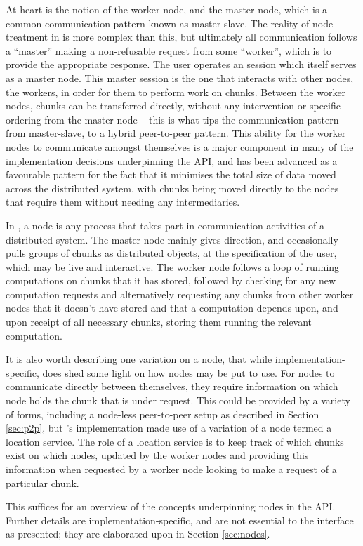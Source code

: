 At heart is the notion of the worker node, and the master node, which is a common communication pattern known as master-slave\cite{rfc2136}.
The reality of node treatment in \lsr is more complex than this, but ultimately all communication follows a ``master'' making a non-refusable request from some ``worker'', which is to provide the appropriate response.
The user operates an \R session which itself serves as a master node.
This master session is the one that interacts with other nodes, the workers, in order for them to perform work on chunks.
Between the worker nodes, chunks can be transferred directly, without any intervention or specific ordering from the master node -- this is what tips the communication pattern from master-slave, to a hybrid peer-to-peer pattern.
This ability for the worker nodes to communicate amongst themselves is a major component in many of the implementation decisions underpinning the API, and has been advanced as a favourable pattern for the fact that it minimises the total size of data moved across the distributed system, with chunks being moved directly to the nodes that require them without needing any intermediaries.

In \lsr, a node is any process that takes part in communication activities of a distributed system.
The master node mainly gives direction, and occasionally pulls groups of chunks as distributed objects, at the specification of the user, which may be live and interactive.
The worker node follows a loop of running computations on chunks that it has stored, followed by checking for any new computation requests and alternatively requesting any chunks from other worker nodes that it doesn't have stored and that a computation depends upon, and upon receipt of all necessary chunks, storing them running the relevant computation.

It is also worth describing one variation on a node, that while implementation-specific, does shed some light on how nodes may be put to use.
For nodes to communicate directly between themselves, they require information on which node holds the chunk that is under request.
This could be provided by a variety of forms, including a node-less peer-to-peer setup as described in Section \cref{sec:p2p}, but \lsr's implementation made use of a variation of a node termed a location service.
The role of a location service is to keep track of which chunks exist on which nodes, updated by the worker nodes and providing this information when requested by a worker node looking to make a request of a particular chunk.

This suffices for an overview of the concepts underpinning nodes in the API.
Further details are implementation-specific, and are not essential to the interface as presented; they are elaborated upon in Section \cref{sec:nodes}.
